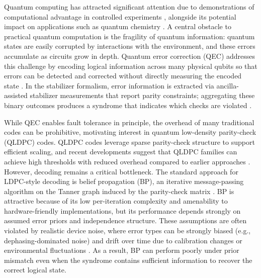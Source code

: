 \documentclass[a4paper,twocolumn,11pt,unpublished,nopdfoutputerror]{quantumarticle}
\begin{document}
Quantum computing has attracted significant attention due to demonstrations of computational advantage in controlled experiments \cite{Arute2019Supremacy,Zhong2020PhotonicAdvantage}, alongside its potential impact on applications such as quantum chemistry \cite{Wang2008QuantumAlgorithm}. A central obstacle to practical quantum computation is the fragility of quantum information: quantum states are easily corrupted by interactions with the environment, and these errors accumulate as circuits grow in depth. Quantum error correction (QEC) addresses this challenge by encoding logical information across many physical qubits so that errors can be detected and corrected without directly measuring the encoded state \cite{Shor1995Scheme,Lidar2013Background}. In the stabilizer formalism, error information is extracted via ancilla-assisted stabilizer measurements that report parity constraints; aggregating these binary outcomes produces a syndrome that indicates which checks are violated \cite{Gottesman1997Stabilizer}.

While QEC enables fault tolerance in principle, the overhead of many traditional codes can be prohibitive, motivating interest in quantum low-density parity-check (QLDPC) codes. QLDPC codes leverage sparse parity-check structure to support efficient scaling, and recent developments suggest that QLDPC families can achieve high thresholds with reduced overhead compared to earlier approaches \cite{Bravyi2024Memory,Panteleev2021QLDPC}. However, decoding remains a critical bottleneck. The standard approach for LDPC-style decoding is belief propagation (BP), an iterative message-passing algorithm on the Tanner graph induced by the parity-check matrix \cite{Roffe2020Landscape}. BP is attractive because of its low per-iteration complexity and amenability to hardware-friendly implementations, but its performance depends strongly on assumed error priors and independence structure. These assumptions are often violated by realistic device noise, where error types can be strongly biased (e.g., dephasing-dominated noise) and drift over time due to calibration changes or environmental fluctuations \cite{Tuckett2018Bias}. As a result, BP can perform poorly under prior mismatch even when the syndrome contains sufficient information to recover the correct logical state.
\end{document}
